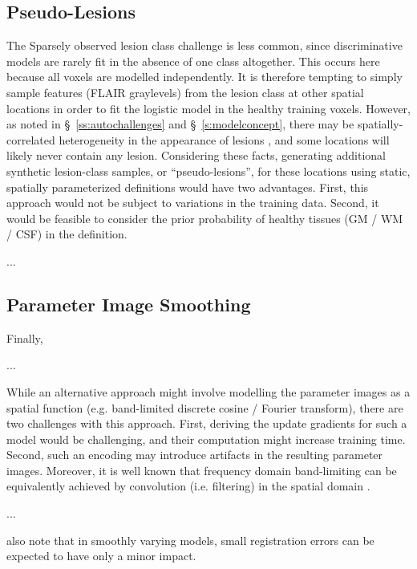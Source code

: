 \subsection{Pseudo-Lesions}
The Sparsely observed lesion class challenge is less common, since discriminative models are rarely fit in the absence of one class altogether. This occurs here because all voxels are modelled independently. It is therefore tempting to simply sample features (FLAIR graylevels) from the lesion class at other spatial locations in order to fit the logistic model in the healthy training voxels. However, as noted in \S\ \ref{ss:autochallenges} and \S\ \ref{s:modelconcept}, there may be spatially-correlated heterogeneity in the appearance of lesions \cite{Sled2004,Stevenson2000}, and some locations will likely never contain any lesion. Considering these facts, generating additional synthetic lesion-class samples, or ``pseudo-lesions'', for these locations using static, spatially parameterized definitions would have two advantages. First, this approach would not be subject to variations in the training data. Second, it would be feasible to consider the prior probability of healthy tissues (GM / WM / CSF) in the definition.
\par...\par
\subsection{Parameter Image Smoothing}
Finally, 
\par...\par
While an alternative approach might involve modelling the parameter images as a spatial function (e.g. band-limited discrete cosine / Fourier transform), there are two challenges with this approach.
First, deriving the update gradients for such a model would be challenging, and their computation might increase training time.
Second, such an encoding may introduce artifacts in the resulting parameter images.
Moreover, it is well known that frequency domain band-limiting can be equivalently achieved by convolution (i.e. filtering) in the spatial domain \cite{Gonzalez2006}.
\par...\par
\citeauthor{Harmouche2015} \cite{Harmouche2015} also note that in smoothly varying models, small registration errors can be expected to have only a minor impact.
